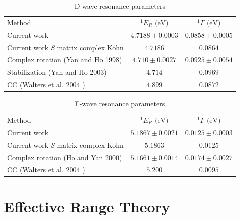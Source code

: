 \documentclass[reprint,showpacs,preprintnumbers,amsmath,amssymb,pra,aps]{revtex4-1}
\begin{document}
\begin{table}[H]
\begin{center}
\begin{ruledtabular}
\begin{tabular}{l c c}
Method & $^1E_R \text{ (eV)}$ & $^1\Gamma \text{ (eV)}$ \\
\colrule
Current work & $4.7188 \pm 0.0003$ & $0.0858 \pm 0.0005$ \\
Current work \emph{S} matrix complex Kohn & $4.7186$ & $0.0864$ \\
Complex rotation (Yan and Ho 1998) \cite{Ho1998} & $4.710 \pm 0.0027$ & $0.0925 \pm 0.0054$  \\
Stabilization (Yan and Ho 2003) \cite{Yan2003} & $4.714$ & $0.0969$ \\
CC (Walters et al. 2004 \cite{Walters2004}) & $4.899$ & $0.0872$ \\
\end{tabular}
\end{ruledtabular}
\caption{D-wave resonance parameters} %
\label{tab:DWaveResonances}
\end{center}
\end{table}


\begin{table}[H]
\begin{center}
\begin{ruledtabular}
\begin{tabular}{l c c}
Method & $^1E_R \text{ (eV)}$ & $^1\Gamma \text{ (eV)}$ \\
\colrule
Current work & $5.1867 \pm 0.0021$ & $0.0125 \pm 0.0003$ \\
Current work \emph{S} matrix complex Kohn & $5.1863$ & $0.0125$ \\
Complex rotation (Ho and Yan 2000) \cite{Ho2000} & $5.1661 \pm 0.0014$ & $0.0174 \pm 0.0027$  \\
CC (Walters et al. 2004 \cite{Walters2004}) & $5.200$ & $0.0095$ \\
\end{tabular}
\end{ruledtabular}
\caption{F-wave resonance parameters} %
\label{tab:FWaveResonances}
\end{center}
\end{table}



\section{Effective Range Theory}
\end{document}
